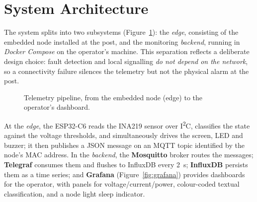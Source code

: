 \documentclass[10pt,a4paper]{article}
\begin{document}
\section{System Architecture}

The system splits into two subsystems (Figure~\ref{fig:pipeline}): the \emph{edge},
consisting of the embedded node installed at the post, and the monitoring
\emph{backend}, running in \emph{Docker Compose} on the operator's machine. This
separation reflects a deliberate design choice: fault detection and local signalling
\emph{do not depend on the network}, so a connectivity failure silences the
telemetry but not the physical alarm at the post.

\begin{figure}[H]
\centering
{}
\caption{Telemetry pipeline, from the embedded node (edge) to the operator's dashboard.}
\label{fig:pipeline}
\end{figure}

At the \emph{edge}, the ESP32-C6 reads the INA219 sensor over I\textsuperscript{2}C,
classifies the state against the voltage thresholds, and simultaneously drives the
screen, LED and buzzer; it then publishes a JSON message on an MQTT topic identified
by the node's MAC address. In the \emph{backend}, the \textbf{Mosquitto} broker
routes the messages; \textbf{Telegraf} consumes them and flushes to InfluxDB every
\SI{2}{\second}; \textbf{InfluxDB} persists them as a time series; and \textbf{Grafana}
(Figure~\ref{fig:grafana}) provides dashboards for the operator, with panels for
voltage/current/power, colour-coded textual classification, and a node light sleep
indicator.
\end{document}
